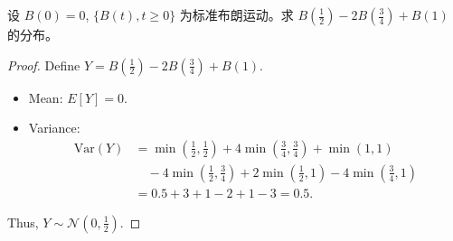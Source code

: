 \documentclass[lang=cn,10pt,thmcnt=section]{elegantbook}
\begin{document}
\begin{example}
	设 $B(0) = 0$, $\{B(t), t \geq 0\}$ 为标准布朗运动。求 $B(\frac{1}{2}) - 2B(\frac{3}{4}) + B(1)$ 的分布。
\end{example}
\begin{proof}
	Define \( Y = B\left(\frac{1}{2}\right) - 2B\left(\frac{3}{4}\right) + B(1) \).
\begin{itemize}
    \item Mean: \( E[Y] = 0 \).
    \item Variance:
    \begin{align*}
    \text{Var}(Y) &= \min\left(\tfrac{1}{2},\tfrac{1}{2}\right) + 4\min\left(\tfrac{3}{4},\tfrac{3}{4}\right) + \min(1,1) \\
    &\quad -4\min\left(\tfrac{1}{2},\tfrac{3}{4}\right) + 2\min\left(\tfrac{1}{2},1\right) -4\min\left(\tfrac{3}{4},1\right) \\
    &= 0.5 + 3 + 1 - 2 + 1 - 3 = 0.5.
    \end{align*}
\end{itemize}
Thus, \( Y \sim \mathcal{N}\left(0, \frac{1}{2}\right) \).
\end{proof}
\end{document}
